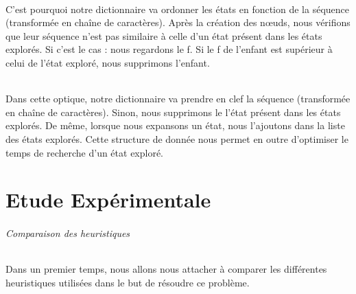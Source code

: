\documentclass[10pt,a4paper]{report}
\begin{document}
\paragraph{}{C'est pourquoi notre dictionnaire va ordonner les états en fonction de la séquence (transformée en chaîne de caractères). Après la création des nœuds, nous vérifions que leur séquence n'est pas similaire à celle d'un état présent dans les états explorés. Si c'est le cas : nous regardons le f. Si le f de l'enfant est supérieur à celui de l'état exploré, nous supprimons l'enfant.}
\paragraph{}{Dans cette optique, notre dictionnaire va prendre en clef la séquence (transformée en chaîne de caractères). Sinon, nous supprimons le l'état présent dans les états explorés. De même, lorsque nous expansons un état, nous l'ajoutons dans la liste des états explorés. Cette structure de donnée nous permet en outre d'optimiser le temps de recherche d'un état exploré.}



\part{Etude Expérimentale}
\paragraph{Comparaison des heuristiques}{Dans un premier temps, nous allons nous attacher à comparer les différentes heuristiques utilisées dans le but de résoudre ce problème.}
\end{document}
